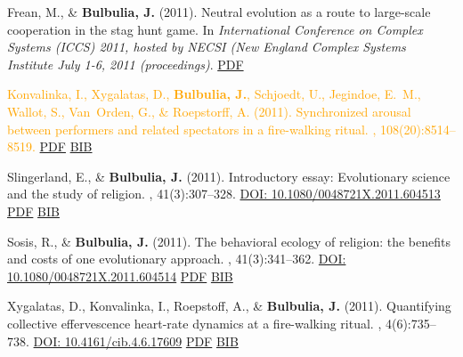 \documentclass{article}
\begin{document}
\begin{thebibliography}{99}
Frean, M., \& {\bf Bulbulia, J.} (2011).
\newblock Neutral evolution as a route to large-scale cooperation in the stag
  hunt game.
\newblock In {\em International Conference on Complex Systems (ICCS) 2011,
  hosted by NECSI (New England Complex Systems Institute July 1-6, 2011
  (proceedings)}.
  \href{https://www.dropbox.com/s/bn4p7ry1cwz2v76/ICCS-259-FreanBulbulia.pdf?dl=0}{PDF}
 

\textcolor{Orange}{Konvalinka, I., Xygalatas, D., {\bf Bulbulia, J.}, Schjoedt, U., Jegindoe, E.~M.,
  Wallot, S., Van~Orden, G., \& Roepstorff, A. (2011).
\newblock Synchronized arousal between performers and related spectators in a
  fire-walking ritual.
,
  108(20):8514--8519.}  \href{https://www.dropbox.com/s/e9kw1bc58arqcum/1016955108-1.full.pdf}{PDF} \href{https://scholar.google.co.nz/scholar.bib?q=info:Z4bz7lwp7CAJ:scholar.google.com/&output=citation&scisig=AAGBfm0AAAAAVQLQj1q3zL48FKlyJACORNS7cgksQjIL&scisf=4&hl=en}{BIB}


Slingerland, E., \& {\bf Bulbulia, J.} (2011).
\newblock Introductory essay: Evolutionary science and the study of religion.
, 41(3):307--328. 
\href{https://doi.org/10.1080/0048721X.2011.604513 }{DOI: 10.1080/0048721X.2011.604513}
	\newblock \href{https://www.dropbox.com/s/w7om74yu1byjces/Slingerland_Bulbulia_2011.pdf?dl=0}{PDF} \href{https://scholar.google.co.nz/scholar.bib?q=info:EuqNIKJICaAJ:scholar.google.com/&output=citation&scisig=AAGBfm0AAAAAVQLQF9j3ZcOMiq4s0i0IlD2LvlZZY93D&scisf=4&hl=en}{BIB}


Sosis, R., \& {\bf Bulbulia, J.} (2011).
\newblock The behavioral ecology of religion: the benefits and costs of one
  evolutionary approach.
, 41(3):341--362. 
\href{https://doi.org/10.1080/0048721X.2011.604514}{DOI: 10.1080/0048721X.2011.604514} \newblock \href{https://www.dropbox.com/s/x6qyj01trcuhfzd/SosisBulbuliaBehEcoRel.pdf?dl=0}{PDF} \href{https://scholar.google.co.nz/scholar.bib?q=info:6KFNe9NrUB0J:scholar.google.com/&output=citation&scisig=AAGBfm0AAAAAVQLQzUevx-JM_Jt5ZX4k_9fxb6dV3u0s&scisf=4&hl=en}{BIB}\


Xygalatas, D., Konvalinka, I., Roepstoff, A., \& {\bf Bulbulia, J.} (2011).
\newblock Quantifying collective effervescence heart-rate dynamics at a
  fire-walking ritual.
, 4(6):735--738.\newblock 
\href{https://doi.org/10.4161/cib.4.6.17609}{DOI: 10.4161/cib.4.6.17609}
\href{https://www.dropbox.com/s/k7sd19xlfiq8huo/XygalatasCIB4-6.pdf}{PDF} \href{https://scholar.google.co.nz/scholar.bib?q=info:ibIMcXjOt4sJ:scholar.google.com/&output=citation&scisig=AAGBfm0AAAAAVQLRpR7fjyHaIZem3vp4nLctXQZrVMcE&scisf=4&hl=en}{BIB} 




\end{thebibliography}
\end{document}
